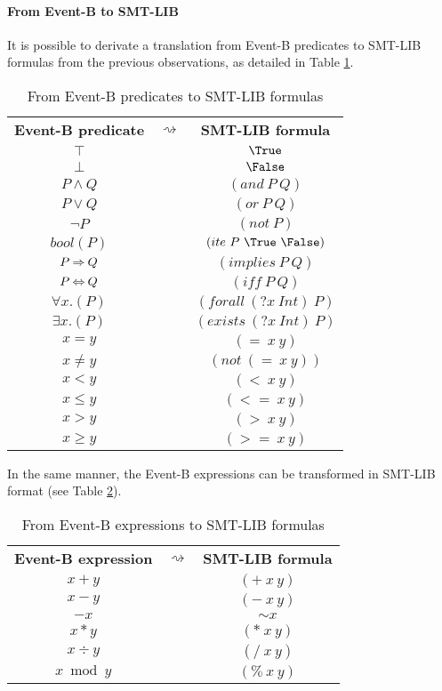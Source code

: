\paragraph{From Event-B to SMT-LIB}
It is possible to derivate a translation from Event-B predicates to SMT-LIB formulas from the previous observations, as detailed in Table \ref{BPRED2SMTLIB}.
\begin{table}[htbp]
\begin{center}
\begin{tabular}{ccc}
 \textbf{Event-B predicate} & \textbf{$\rightsquigarrow$} & \textbf{SMT-LIB formula} \\ 
 $\top$ & & $\True$ \\
 $\bot$ & & $\False$ \\
 $P \land Q$ & & $(and~P~Q)$ \\
 $P \lor Q$ & & $(or~P~Q)$ \\
 $\lnot P$ & & $(not~P)$ \\
 $bool(P)$ & & $(ite~P~\True~\False)$ \\
 $P \mathbin\Rightarrow Q$ & & $(implies~P~Q)$ \\
 $P \mathbin\Leftrightarrow Q$ & & $(iff~P~Q)$ \\
 $\forall{x}.(P)$ & & $(forall~(?x~Int)~P)$ \\
 $\exists{x}.(P)$ & & $(exists~(?x~Int)~P)$ \\
 $x = y$ & & $(=~x~y)$ \\
 $x \neq y$ & & $(not~(=~x~y))$ \\
 $x < y$ & & $(<~x~y)$ \\
 $x \leq y$ & & $(<=~x~y)$ \\
 $x > y$ & & $(>~x~y)$ \\
 $x \geq y$ & & $(>=~x~y)$ \\
\end{tabular} 
\end{center}
\caption{From Event-B predicates to SMT-LIB formulas}
\label{BPRED2SMTLIB}
\end{table}

In the same manner, the Event-B expressions can be transformed in SMT-LIB format (see Table \ref{BEXPR2SMTLIB}).

\begin{table}[htbp]
\begin{center}
\begin{tabular}{ccc}
 \textbf{Event-B expression} & \textbf{$\rightsquigarrow$} & \textbf{SMT-LIB formula} \\ 
 $x + y$ & & $(+~x~y)$ \\
 $x - y$ & & $(-~x~y)$ \\
 $-x$ & & $\sim x$ \\
 $x * y$ & & $(*~x~y)$ \\
 $x \div y$ & & $(/~x~y)$ \\
 $x \bmod y$ & & $(\%~x~y)$ \\
\end{tabular} 
\end{center}
\caption{From Event-B expressions to SMT-LIB formulas}
\label{BEXPR2SMTLIB}
\end{table}

